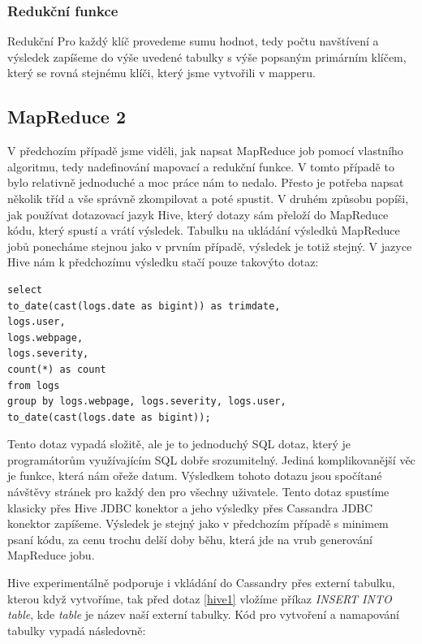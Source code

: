 \subsubsection{Redukční funkce}
Redukční  Pro každý klíč provedeme sumu hodnot, tedy počtu navštívení a výsledek zapíšeme do výše uvedené tabulky s výše popsaným primárním klíčem, který se rovná stejnému klíči, který jsme vytvořili v mapperu. 

\subsection{MapReduce 2}
V předchozím případě jsme viděli, jak napsat MapReduce job pomocí vlastního algoritmu, tedy nadefinování mapovací a redukční funkce. V tomto případě to bylo relativně jednoduché a moc práce nám to nedalo. Přesto je potřeba napsat několik tříd a vše správně zkompilovat a poté spustit. V druhém způsobu popíši, jak používat dotazovací jazyk Hive, který dotazy sám přeloží do MapReduce kódu, který spustí a vrátí výsledek. Tabulku na ukládání výsledků MapReduce jobů ponecháme stejnou jako v prvním případě, výsledek je totiž stejný. V jazyce Hive nám k předchozímu výsledku stačí pouze takovýto dotaz:

\begin{lstlisting}[caption={Tabulka pro ukládání reportů},label=Hive1]
select 
to_date(cast(logs.date as bigint)) as trimdate,
logs.user,
logs.webpage,
logs.severity, 
count(*) as count
from logs 
group by logs.webpage, logs.severity, logs.user,
to_date(cast(logs.date as bigint));
\end{lstlisting}

Tento dotaz vypadá složitě, ale je to jednoduchý SQL dotaz, který je programátorům využívajícím SQL dobře srozumitelný. Jediná komplikovanější věc je funkce, která nám ořeže datum. Výsledkem tohoto dotazu jsou spočítané návštěvy stránek pro každý den pro všechny uživatele. Tento dotaz spustíme klasicky přes Hive JDBC konektor a jeho výsledky přes Cassandra JDBC konektor zapíšeme. Výsledek je stejný jako v předchozím případě s minimem psaní kódu, za cenu trochu delší doby běhu, která jde na vrub generování MapReduce jobu. 

Hive experimentálně podporuje i vkládání do Cassandry přes externí tabulku, kterou když vytvoříme, tak před dotaz \ref{hive1} vložíme příkaz \emph{INSERT INTO table}, kde \emph{table} je název naší externí tabulky. Kód pro vytvoření a namapování tabulky vypadá následovně: 

